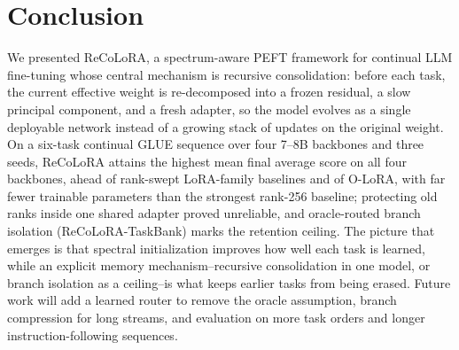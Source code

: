 \documentclass[11pt]{article}
\begin{document}
\section{Conclusion}
We presented ReCoLoRA, a spectrum-aware PEFT framework for continual LLM fine-tuning whose central mechanism is recursive consolidation: before each task, the current effective weight is re-decomposed into a frozen residual, a slow principal component, and a fresh adapter, so the model evolves as a single deployable network instead of a growing stack of updates on the original weight. On a six-task continual GLUE sequence over four 7--8B backbones and three seeds, ReCoLoRA attains the highest mean final average score on all four backbones, ahead of rank-swept LoRA-family baselines and of O-LoRA, with far fewer trainable parameters than the strongest rank-256 baseline; protecting old ranks inside one shared adapter proved unreliable, and oracle-routed branch isolation (ReCoLoRA-TaskBank) marks the retention ceiling. The picture that emerges is that spectral initialization improves how well each task is learned, while an explicit memory mechanism--recursive consolidation in one model, or branch isolation as a ceiling--is what keeps earlier tasks from being erased. Future work will add a learned router to remove the oracle assumption, branch compression for long streams, and evaluation on more task orders and longer instruction-following sequences.

\appendix
\end{document}
